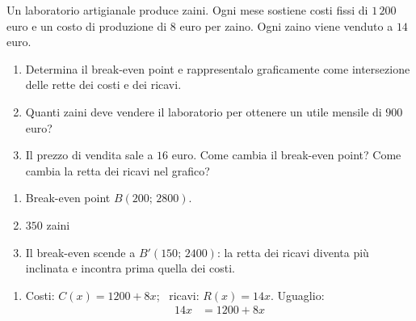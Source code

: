 \begin{question}[ID=4.5, subtitle={Break-even e utile desiderato}, difficulty=difficile, tags={sistemi, break-even, grafici}]
Un laboratorio artigianale produce zaini. Ogni mese sostiene costi fissi di $1\,200$ euro e un costo di produzione di $8$ euro per zaino. Ogni zaino viene venduto a $14$ euro.
\begin{enumerate}[label=\alph*),leftmargin=1.8cm]
    \item Determina il break-even point e rappresentalo graficamente come intersezione delle rette dei costi e dei ricavi.
    \item Quanti zaini deve vendere il laboratorio per ottenere un utile mensile di $900$ euro?
    \item Il prezzo di vendita sale a $16$ euro. Come cambia il break-even point? Come cambia la retta dei ricavi nel grafico?
\end{enumerate}
\begin{solution}
\begin{enumerate}[label=\alph*),leftmargin=1.8cm]
    \item Break-even point $B(200;\,2800)$.
\begin{center}
\end{center}
    \item $350$ zaini
    \item Il break-even scende a $B'(150;\,2400)$: la retta dei ricavi diventa più inclinata e incontra prima quella dei costi.
\end{enumerate}
\end{solution}
\begin{explanation}
\begin{enumerate}[label=\alph*),leftmargin=1.8cm]
    \item Costi: $C(x)=1200+8x$; \ ricavi: $R(x)=14x$. Uguaglio:
    \[\begin{aligned}
    14x &= 1200+8x\\

\end{aligned}\]
\end{enumerate}
\end{explanation}
\end{question}
